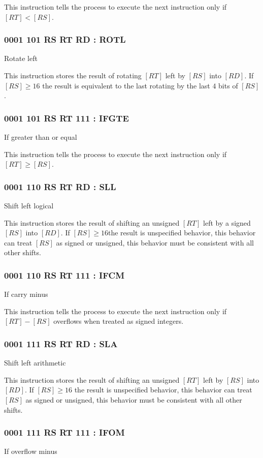 \documentclass[12pt,letterpaper]{report}
\newcommand{\reg}[1]{\left[#1\right]}
\begin{document}
This instruction tells the process to execute the next instruction only if $\reg{RT} < \reg{RS}$.
\subsubsection{0001 101  RS  RT  RD : ROTL}
Rotate left

This instruction stores the result of rotating $\reg{RT}$ left by $\reg{RS}$ into $\reg{RD}$. If $\reg{RS} \geq 16$ the result is equivalent to the last rotating by the last $4$ bits of $\reg{RS}$.
\subsubsection{0001 101  RS  RT 111 : IFGTE}
If greater than or equal

This instruction tells the process to execute the next instruction only if $\reg{RT} \geq \reg{RS}$.
\subsubsection{0001 110  RS  RT  RD : SLL}
Shift left logical

This instruction stores the result of shifting an unsigned $\reg{RT}$ left by a signed $\reg{RS}$ into $\reg{RD}$. If $\reg{RS} \geq 16$the result is unspecified behavior, this behavior can treat $\reg{RS}$ as signed or unsigned, this behavior must be consistent with all other shifts.
\subsubsection{0001 110  RS  RT 111 : IFCM}
If carry minus

This instruction tells the process to execute the next instruction only if $\reg{RT} - \reg{RS}$ overflows when treated as signed integers.
\subsubsection{0001 111  RS  RT  RD : SLA}
Shift left arithmetic

This instruction stores the result of shifting an unsigned $\reg{RT}$ left by $\reg{RS}$ into $\reg{RD}$. If $\reg{RS} \geq 16$ the result is unspecified behavior, this behavior can treat $\reg{RS}$ as signed or unsigned, this behavior must be consistent with all other shifts.
\subsubsection{0001 111  RS  RT 111 : IFOM}
If overflow minus
\end{document}
